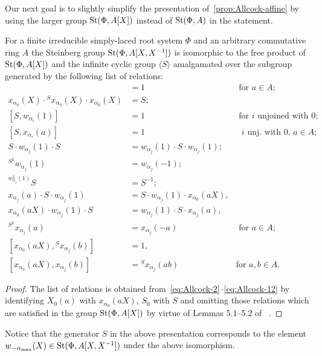 Our next goal is to slightly simplify the presentation of~\cref{prop:Allcock-affine} by using the larger group $\operatorname{St}(\Phi, A[X])$ instead of $\operatorname{St}(\Phi, A)$ in the statement.
\begin{cor} \label{cor:Allcock-simpler}
    For a finite irreducible simply-laced root system $\Phi$ and an arbitrary commutative ring $A$ the Steinberg group $\operatorname{St}(\Phi, A[X, X^{-1}])$ is isomorphic
    to the free product of $\operatorname{St}(\Phi, A[X])$ and the infinite cyclic group $\langle S \rangle$ amalgamated over the subgroup generated by the following list of relations:
    {\allowdisplaybreaks\begin{align}
    [S^2, x_{\alpha_0}(aX)] & = 1 & \text{ for $a \in A$; } \label{eq:simpler-2} \\
    x_{\alpha_0}(X) \cdot {}^{S} x_{\alpha_0}(X) \cdot x_{\alpha_0}(X) & = S; \label{eq:simpler-3} \\
    [S, w_{\alpha_i}(1)] & = 1 & \text{ for $i$ unjoined with $0$;} \label{eq:simpler-4} \\
    [S, x_{\alpha_i}(a)] & = 1 & \text{ $i$ unj. with $0$, $a \in A$; } \label{eq:simpler-5-1}\\
    S \cdot w_{\alpha_j}(1) \cdot S & = w_{\alpha_j}(1) \cdot S \cdot w_{\alpha_j}(1); \label{eq:simpler-7} \\
    {}^{S^2} w_{\alpha_j}(1) & = w_{\alpha_j}(-1); \label{eq:simpler-8-1} \\
    {}^{w_{\alpha_j}^2(1)} S & = S^{-1}; \label{eq:simpler-8-2} \\
    x_{\alpha_j}(a) \cdot S \cdot w_{\alpha_j}(1) & = S \cdot w_{\alpha_j}(1) \cdot x_{\alpha_0}(aX), & \label{eq:simpler-9-1} \\
    x_{\alpha_0}(aX) \cdot w_{\alpha_j}(1) \cdot S & = w_{\alpha_j}(1) \cdot S \cdot x_{\alpha_j}(a), & \label{eq:simpler-9-2} \\
    {}^{S^2} x_{\alpha_j}(a) & = x_{\alpha_j}(-a) & \text{ for $a \in A$; } \label{eq:simpler-10-1} \\
    [x_{\alpha_0}(aX), {}^{S} x_{\alpha_j}(b)] &= 1, & \label{eq:simpler-11-1} \\
    [x_{\alpha_0}(aX), x_{\alpha_j}(b)] &= {}^{S} x_{\alpha_j}(ab) & \text{for $a, b \in A.$} \label{eq:simpler-12}
    \end{align}}
\end{cor}
\begin{proof}
    The list of relations is obtained from~\eqref{eq:Allcock-2}--\eqref{eq:Allcock-12} by identifying $X_0(a)$ with $x_{\alpha_0}(aX)$, $S_0$ with $S$ and omitting those relations
     which are satisfied in the group $\operatorname{St}(\Phi, A[X])$ by virtue of Lemmas 5.1--5.2 of ~\cite{Ma69}.
\end{proof}
\begin{rem}
    Notice that the generator $S$ in the above presentation corresponds to the element $w_{-\alpha_\mathrm{max}}(X) \in \operatorname{St}(\Phi, A[X, X^{-1}])$ under the above isomorphism.
\end{rem}

